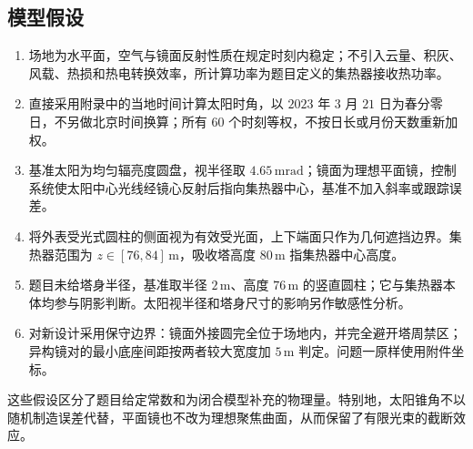 \documentclass[UTF8,a4paper,zihao=-4,fontset=mac]{ctexart}
\begin{document}
\subsection{模型假设}
\begin{enumerate}[label=假设\arabic*：,leftmargin=4em]
\item 场地为水平面，空气与镜面反射性质在规定时刻内稳定；不引入云量、积灰、风载、热损和热电转换效率，所计算功率为题目定义的集热器接收热功率。
\item 直接采用附录中的当地时间计算太阳时角，以 $2023$ 年 $3$ 月 $21$ 日为春分零日，不另做北京时间换算；所有 $60$ 个时刻等权，不按日长或月份天数重新加权。
\item 基准太阳为均匀辐亮度圆盘，视半径取 $4.65\,\mathrm{mrad}$；镜面为理想平面镜，控制系统使太阳中心光线经镜心反射后指向集热器中心，基准不加入斜率或跟踪误差。
\item 将外表受光式圆柱的侧面视为有效受光面，上下端面只作为几何遮挡边界。集热器范围为 $z\in[76,84]\,\mathrm m$，吸收塔高度 $80\,\mathrm m$ 指集热器中心高度。
\item 题目未给塔身半径，基准取半径 $2\,\mathrm m$、高度 $76\,\mathrm m$ 的竖直圆柱；它与集热器本体均参与阴影判断。太阳视半径和塔身尺寸的影响另作敏感性分析。
\item 对新设计采用保守边界：镜面外接圆完全位于场地内，并完全避开塔周禁区；异构镜对的最小底座间距按两者较大宽度加 $5\,\mathrm m$ 判定。问题一原样使用附件坐标。
\end{enumerate}

这些假设区分了题目给定常数和为闭合模型补充的物理量。特别地，太阳锥角不以随机制造误差代替，平面镜也不改为理想聚焦曲面，从而保留了有限光束的截断效应。

\end{document}
